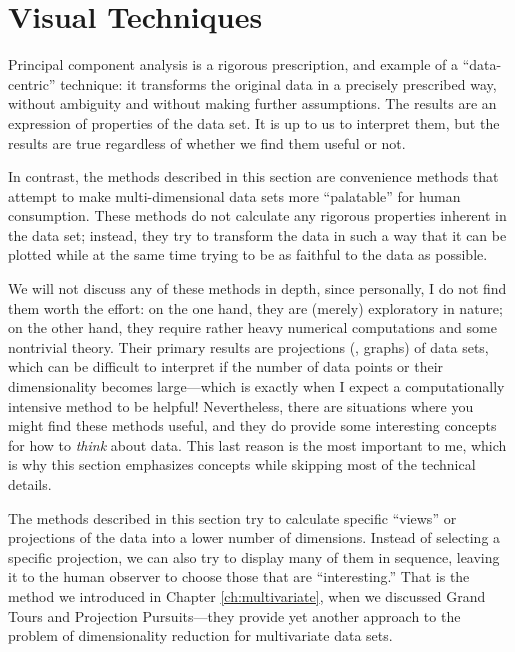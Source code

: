% 

\section{Visual Techniques}


Principal component analysis is a rigorous prescription, and example
of a ``data-centric'' technique: it transforms the original data in a
precisely prescribed way, without ambiguity and without making further
assumptions. The results are an expression of properties of the data
set. It is up to us to interpret them, but the results are true
regardless of whether we find them useful or not.

In contrast, the methods described in this section are convenience
methods that attempt to make multi-dimensional data sets more
``palatable'' for human consumption. These methods do not calculate
any rigorous properties inherent in the data set; instead, they try to
transform the data in such a way that it can be plotted while at the
same time trying to be as faithful to the data as possible.

We will not discuss any of these methods in depth, since personally, I
do not find them worth the effort: on the one hand, they are (merely)
exploratory in nature; on the other hand, they require rather heavy
numerical computations and some nontrivial theory.  Their primary
results are projections (\ie, graphs) of data sets, which can be
difficult to interpret if the number of data points or their
dimensionality becomes large---which is exactly when I expect a
computationally intensive method to be helpful!  Nevertheless,\vadjust{\pagebreak} there
are situations where you might find these methods useful, and they do
provide some interesting concepts for how to \emph{think} about data.
This last reason is the most important to me, which is why this
section emphasizes concepts while skipping most of the technical
details.
 

The methods described in this section try to calculate specific
``views'' or projections of the data into a lower number of
dimensions.  Instead of selecting a specific projection, we can also
try to display many of them in sequence, leaving it to the human
observer to choose those that are ``interesting.'' That is the method
we introduced in Chapter \ref{ch:multivariate}, when we discussed
Grand Tours and Projection Pursuits---they provide yet another
approach to the problem of dimensionality reduction for multivariate
data sets.
 

